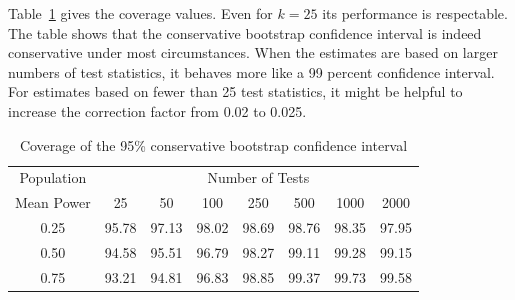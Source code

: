 \documentclass[jou]{apa6} %
\begin{document}
Table~\ref{coverage} gives the coverage values. Even for $k=25$ its performance is respectable. The table shows that the conservative bootstrap confidence interval is indeed conservative under most circumstances. When the estimates are based on larger numbers of test statistics, it behaves more like a 99 percent confidence interval. For estimates based on fewer than 25 test statistics, it might be helpful to increase the correction factor from 0.02 to 0.025. 

\begin{table} [H]
\caption{Coverage of the 95\% conservative bootstrap confidence interval}
{\scriptsize
\begin{center}
\begin{tabular}{c ccccccc }  \hline
Population & \multicolumn{7}{c}{Number of Tests} \\
Mean Power  &  25   &  50   &  100   &  250   &  500  & 1000  & 2000 \\ \hline
    0.25    & 95.78  & 97.13 & 98.02  & 98.69  & 98.76 & 98.35 & 97.95 \\
    0.50    & 94.58  & 95.51 & 96.79  & 98.27  & 99.11 & 99.28 & 99.15 \\
    0.75    & 93.21  & 94.81 & 96.83  & 98.85  & 99.37 & 99.73 & 99.58 \\ \hline
\end{tabular}
\end{center}
} %
\label{coverage}  %
\end{table}
\end{document}
